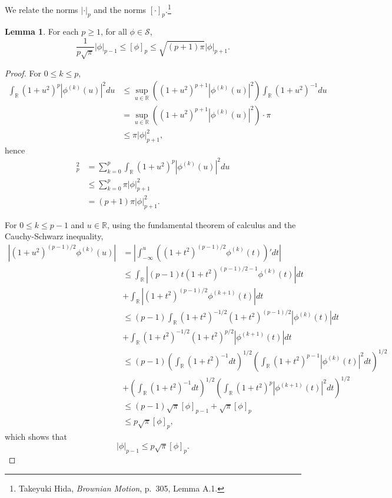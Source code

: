 \documentclass{article}
\theoremstyle{definition}
\newtheorem{lemma}[theorem]{Lemma}
\theoremstyle{definition}
\begin{document}
We relate the norms $|\cdot|_p$ and the norms $[\cdot]_p$.\footnote{Takeyuki Hida,
{\em Brownian Motion}, p.~305, Lemma A.1.}

\begin{lemma}
For each $p \geq 1$, for all
$\phi \in \mathscr{S}$,
\[
\frac{1}{p\sqrt{\pi}} |\phi|_{p-1} \leq [\phi]_p \leq  \sqrt{(p+1)\pi} |\phi|_{p+1}.
\]
\label{L2equiv}
\end{lemma}
\begin{proof}
For $0 \leq k \leq p$,
\begin{align*}
\int_{\mathbb{R}} (1+u^2)^p |\phi^{(k)}(u)|^2 du &\leq \sup_{u \in \mathbb{R}} ((1+u^2)^{p+1} |\phi^{(k)}(u)|^2) 
\int_{\mathbb{R}} (1+u^2)^{-1} du\\
&=  \sup_{u \in \mathbb{R}} ((1+u^2)^{p+1} |\phi^{(k)}(u)|^2)  \cdot \pi\\
&\leq \pi |\phi|_{p+1}^2,
\end{align*}
hence
\begin{align*}
[\phi]_p^2&=  \sum_{k=0}^p \int_{\mathbb{R}} (1+u^2)^p |\phi^{(k)}(u)|^2 du\\
&\leq \sum_{k=0}^p \pi |\phi|_{p+1}^2\\
&=(p+1)\pi  |\phi|_{p+1}^2.
\end{align*}


For $0 \leq k \leq p-1$ and $u \in \mathbb{R}$, using the fundamental theorem of calculus and the Cauchy-Schwarz inequality,
\begin{align*}
|(1+u^2)^{(p-1)/2}\phi^{(k)}(u)|&=\left| \int_{-\infty}^u ((1+t^2)^{(p-1)/2} \phi^{(k)}(t))' dt\right|\\
&\leq \int_{\mathbb{R}} |(p-1)t (1+t^2)^{(p-1)/2-1} \phi^{(k)}(t)| dt\\
&+\int_{\mathbb{R}} |(1+t^2)^{(p-1)/2} \phi^{(k+1)}(t)| dt\\
&\leq (p-1) \int_{\mathbb{R}} (1+t^2)^{-1/2} (1+t^2)^{(p-1)/2} |\phi^{(k)}(t)| dt\\
&+\int_{\mathbb{R}} (1+t^2)^{-1/2} (1+t^2)^{p/2} |\phi^{(k+1)}(t)| dt\\
&\leq (p-1) \left(\int_{\mathbb{R}} (1+t^2)^{-1} dt \right)^{1/2} \left( \int_{\mathbb{R}} (1+t^2)^{p-1} |\phi^{(k)}(t)|^2 dt\right)^{1/2}\\
&+\left(\int_{\mathbb{R}} (1+t^2)^{-1} dt\right)^{1/2} \left(\int_{\mathbb{R}} (1+t^2)^p |\phi^{(k+1)}(t)|^2 dt \right)^{1/2}\\
&\leq (p-1)\sqrt{\pi} [\phi]_{p-1} + \sqrt{\pi} [\phi]_p\\
&\leq p\sqrt{\pi} [\phi]_p,
\end{align*}
which shows that
\[
|\phi|_{p-1} \leq p\sqrt{\pi} [\phi]_p.
\]
\end{proof}
\end{document}
